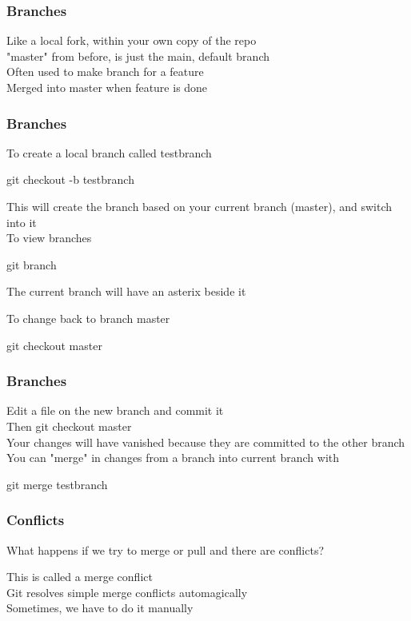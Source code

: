 \documentclass[xcolor=dvipsnames]{beamer}
\begin{document}
\begin{frame}
    \frametitle{Branches}
    
    Like a local fork, within your own copy of the repo\\
    "master" from before, is just the main, default branch\\
    Often used to make branch for a feature\\
    Merged into master when feature is done\\
\end{frame}

\begin{frame}
    \frametitle{Branches}

    To create a local branch called testbranch
    \begin{block}{}
        git checkout -b testbranch
    \end{block}
    This will create the branch based on your current branch (master), and switch into it\\

    To view branches
    \begin{block}{}
        git branch
    \end{block}
    The current branch will have an asterix beside it

    To change back to branch master
    \begin{block}{}
        git checkout master
    \end{block}
\end{frame}

\begin{frame}
    \frametitle{Branches}
        Edit a file on the new branch and commit it\\
        Then git checkout master\\
        Your changes will have vanished because they are committed to the other branch\\
        You can "merge" in changes from a branch into current branch with
        \begin{block}{}
            git merge testbranch
        \end{block}
\end{frame}

\begin{frame}
    \frametitle{Conflicts}

    What happens if we try to merge or pull and there are conflicts?\\\vbox{}
    
    This is called a merge conflict\\
    Git resolves simple merge conflicts automagically\\
    Sometimes, we have to do it manually\\
\end{frame}
\end{document}
